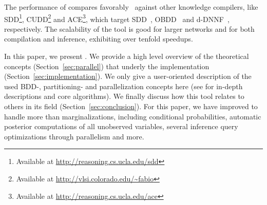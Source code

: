 The performance of \toolname compares favorably~\cite{dal2018parallel,dal2021compositional} against other knowledge compilers, like  SDD\footnote{Available at \url{http://reasoning.cs.ucla.edu/sdd}}, CUDD\footnote{Available at \url{http://vlsi.colorado.edu/~fabio}} and ACE\footnote{Available at \url{http://reasoning.cs.ucla.edu/ace}}, which target SDD~\cite{darwiche2011sdd}, OBDD~\cite{bryant1986graph} and d-DNNF~\cite{darwiche2002knowledge}, respectively. The scalability of the tool is good for larger networks and for both compilation and inference, exhibiting over tenfold speedups.

In this paper, we present \toolname. We provide a high level overview of the theoretical concepts (Section~\ref{sec:parallel}) that underly the implementation (Section~\ref{sec:implementation}). We only give a user-oriented description of the used BDD-, partitioning- and parallelization concepts here (see \cite{dal2018parallel,dal2021compositional} for in-depth descriptions and core algorithms). We finally discuss how this tool relates to others in its field (Section~\ref{sec:conclusion}). For this paper, we have improved \toolname to handle more than marginalizations, including conditional probabilities, automatic posterior computations of all unobserved variables, several inference query optimizations through parallelism and more. 


